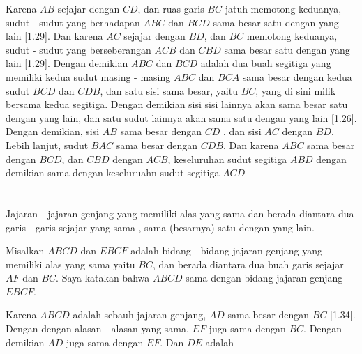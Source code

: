 \documentclass[a4paper, 12pt]{book}
\begin{document}
Karena $AB$ sejajar dengan $CD$, dan ruas garis $BC$ jatuh memotong keduanya, sudut - sudut yang 
berhadapan $ABC$ dan $BCD$ sama besar satu dengan yang lain [1.29]. Dan karena $AC$ sejajar dengan
$BD$, dan $BC$ memotong keduanya, sudut - sudut yang berseberangan $ACB$ dan $CBD$ sama besar satu 
dengan yang lain [1.29]. Dengan demikian $ABC$ dan $BCD$ adalah dua buah segitiga yang memiliki
kedua sudut masing - masing $ABC$ dan $BCA$ sama besar dengan kedua sudut $BCD$ dan $CDB$, dan satu 
sisi sama besar, yaitu $BC$, yang di sini milik bersama kedua segitiga.
Dengan demikian sisi sisi lainnya akan sama besar satu dengan yang lain, 
dan satu sudut lainnya akan sama satu dengan yang lain [1.26]. Dengan demikian, sisi $AB$ 
sama besar dengan $CD$ , dan sisi $AC$ dengan $BD$. Lebih lanjut, sudut $BAC$ sama besar
dengan $CDB$. Dan karena $ABC$ sama besar dengan $BCD$, dan $CBD$ dengan $ACB$, keseluruhan
sudut segitiga $ABD$ dengan demikian sama dengan keseluruahn  sudut segitiga $ACD$


\section*{\centering \thesection}
\par Jajaran - jajaran genjang yang memiliki alas yang sama dan berada diantara dua
garis - garis sejajar yang sama , sama (besarnya) satu dengan yang lain.  


Misalkan $ABCD$ dan $EBCF$ adalah bidang - bidang jajaran genjang yang memiliki alas yang sama yaitu $BC$, 
dan berada diantara dua buah garis sejajar $AF$ dan $BC$. Saya katakan bahwa $ABCD$ sama dengan bidang
jajaran genjang $EBCF$.  

Karena $ABCD$ adalah sebauh jajaran genjang, $AD$ sama besar dengan $BC$ [1.34]. Dengan dengan alasan - alasan
yang sama, $EF$ juga sama dengan $BC$. Dengan demikian $AD$ juga sama dengan $EF$. Dan $DE$ adalah 
\end{document}
